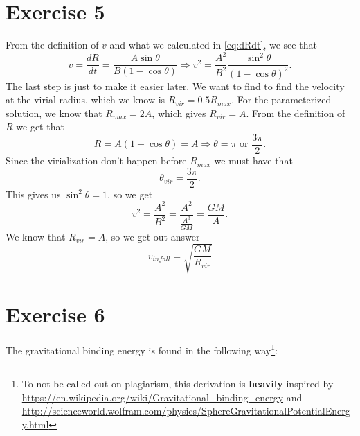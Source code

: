 \documentclass[a4paper,norsk, 10pt]{article}
\begin{document}
\section{Exercise 5}
From the definition of $v$ and what we calculated in \eqref{eq:dRdt}, we see that
\begin{equation}
v = \frac{dR}{dt} = \frac{A\sin\theta}{B(1-\cos \theta)} \Rightarrow v^2 = \frac{A^2}{B^2}\frac{\sin^2 \theta}{(1-\cos \theta)^2}.
\end{equation}
The last step is just to make it easier later. We want to find to find the velocity at the virial radius, which we know is $R_{vir} = 0.5R_{max}$. For the parameterized solution, we know that $R_{max} = 2A$, which gives $R_{vir} = A$. From the definition of $R$ we get that
\begin{equation}
R = A(1-\cos \theta) = A \Rightarrow \theta = \pi \text{ or } \frac{3\pi}{2}. 
\end{equation}
Since the virialization don't happen before $R_{max}$ we must have that
\begin{equation}
\theta_{vir} = \frac{3\pi}{2}.
\end{equation}
This gives us $\sin^2 \theta = 1$, so we get
\begin{equation}
v^2 = \frac{A^2}{B^2} = \frac{A^2}{\frac{A^3}{GM}} = \frac{GM}{A}.
\end{equation}
We know that $R_{vir} = A$, so we get out answer
\begin{equation}
v_{infall} = \sqrt{\frac{GM}{R_{vir}}}
\end{equation}

\section{Exercise 6}
The gravitational binding energy is found in the following way\footnote{To not be called out on plagiarism, this derivation is \textbf{heavily} inspired by \url{https://en.wikipedia.org/wiki/Gravitational_binding_energy} and \url{http://scienceworld.wolfram.com/physics/SphereGravitationalPotentialEnergy.html}}:
\end{document}
